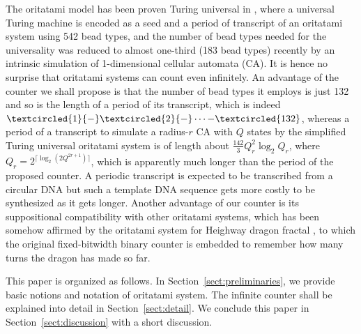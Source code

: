 \documentclass[twocolumn]{svjour3}
\begin{document}
The oritatami model has been proven Turing universal in \cite{GeMeScSe2018}, where a universal Turing machine is encoded as a seed and a period of transcript of an oritatami system using 542 bead types, and the number of bead types needed for the universality was reduced to almost one-third (183 bead types) recently \cite{PchelinaSSU2020} by an intrinsic simulation of 1-dimensional cellular automata (CA). 
It is hence no surprise that oritatami systems can count even infinitely. 
An advantage of the counter we shall propose is that the number of bead types it employs is just 132 and so is the length of a period of its transcript, which is indeed $\textcircled{\scriptsize 1}{-}\textcircled{\scriptsize 2}{-} \cdots {-}\textcircled{\tiny 132}$, whereas a period of a transcript to simulate a radius-$r$ CA with $Q$ states by the simplified Turing universal oritatami system is of length about $\frac{142}{3}Q_r^2 \log_2 Q_r$, where $Q_r = 2^{\lceil \log_2(2Q^{2r+1})\rceil}$, which is apparently much longer than the period of the proposed counter. 
A periodic transcript is expected to be transcribed from a circular DNA \cite{GearyAndersen2014} but such a template DNA sequence gets more costly to be synthesized as it gets longer. 
Another advantage of our counter is its suppositional compatibility with other oritatami systems, which has been somehow affirmed by the oritatami system for Heighway dragon fractal \cite{MasudaSekiUbukata2018}, to which the original fixed-bitwidth binary counter is embedded to remember how many turns the dragon has made so far. 

This paper is organized as follows. 
In Section~\ref{sect:preliminaries}, we provide basic notions and notation of oritatami system. 
The infinite counter shall be explained into detail in Section~\ref{sect:detail}. 
We conclude this paper in Section~\ref{sect:discussion} with a short discussion. 
\end{document}
